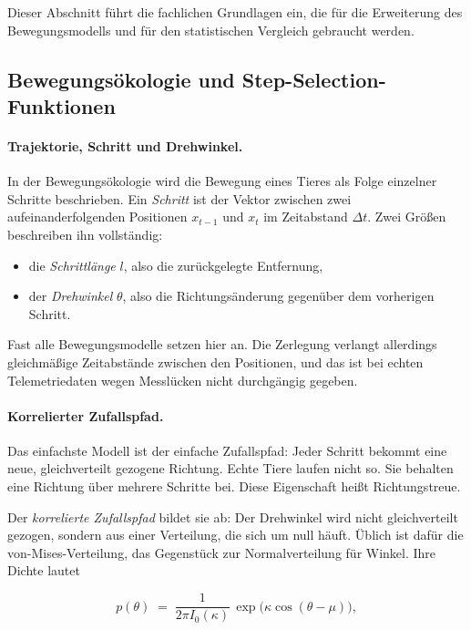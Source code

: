 \documentclass[12pt,a4paper]{report}
\begin{document}
Dieser Abschnitt führt die fachlichen Grundlagen ein, die für die Erweiterung des
Bewegungsmodells und für den statistischen Vergleich gebraucht werden.

\subsection{Bewegungsökologie und Step-Selection-Funktionen}
\label{subsec:bewegungsoekologie}

\paragraph{Trajektorie, Schritt und Drehwinkel.}

In der Bewegungsökologie wird die Bewegung eines Tieres als Folge einzelner Schritte
beschrieben. Ein \emph{Schritt} ist der Vektor zwischen zwei aufeinanderfolgenden
Positionen $x_{t-1}$ und $x_{t}$ im Zeitabstand $\Delta t$. Zwei Größen beschreiben ihn
vollständig:

\begin{itemize}
    \item die \emph{Schrittlänge} $l$, also die zurückgelegte Entfernung,
    \item der \emph{Drehwinkel} $\theta$, also die Richtungsänderung gegenüber dem
    vorherigen Schritt.
\end{itemize}

Fast alle Bewegungsmodelle setzen hier an. Die Zerlegung verlangt allerdings gleichmäßige
Zeitabstände zwischen den Positionen, und das ist bei echten Telemetriedaten wegen
Messlücken nicht durchgängig gegeben.

\paragraph{Korrelierter Zufallspfad.}

Das einfachste Modell ist der einfache Zufallspfad: Jeder Schritt bekommt eine neue,
gleichverteilt gezogene Richtung. Echte Tiere laufen nicht so. Sie behalten eine Richtung
über mehrere Schritte bei. Diese Eigenschaft heißt Richtungstreue.

Der \emph{korrelierte Zufallspfad} bildet sie ab: Der Drehwinkel wird nicht
gleichverteilt gezogen, sondern aus einer Verteilung, die sich um null häuft. Üblich ist
dafür die von-Mises-Verteilung, das Gegenstück zur Normalverteilung für Winkel. Ihre Dichte
lautet

\begin{equation}
    p(\theta) \;=\; \frac{1}{2\pi I_{0}(\kappa)}\,
    \exp\!\bigl(\kappa \cos(\theta - \mu)\bigr),
    \label{eq:vonmises}
\end{equation}
\end{document}
